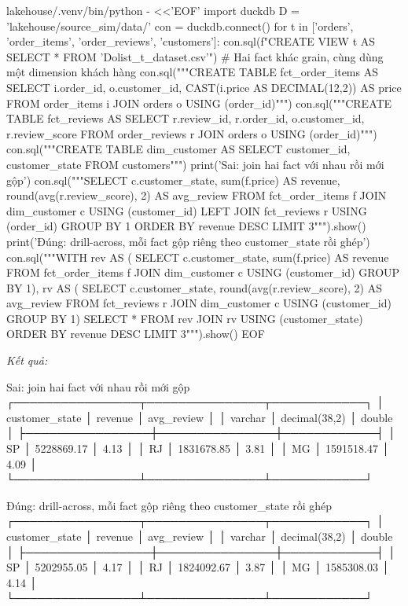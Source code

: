 \begin{codeblock}
lakehouse/.venv/bin/python - <<'EOF'
import duckdb
D = 'lakehouse/source_sim/data/'
con = duckdb.connect()
for t in ['orders', 'order_items', 'order_reviews', 'customers']:
    con.sql(f"CREATE VIEW {t} AS SELECT * FROM '{D}olist_{t}_dataset.csv'")
# Hai fact khác grain, cùng dùng một dimension khách hàng
con.sql("""CREATE TABLE fct_order_items AS
  SELECT i.order_id, o.customer_id, CAST(i.price AS DECIMAL(12,2)) AS price
  FROM order_items i JOIN orders o USING (order_id)""")
con.sql("""CREATE TABLE fct_reviews AS
  SELECT r.review_id, r.order_id, o.customer_id, r.review_score
  FROM order_reviews r JOIN orders o USING (order_id)""")
con.sql("""CREATE TABLE dim_customer AS
  SELECT customer_id, customer_state FROM customers""")
print('Sai: join hai fact với nhau rồi mới gộp')
con.sql("""SELECT c.customer_state, sum(f.price) AS revenue,
                  round(avg(r.review_score), 2) AS avg_review
           FROM fct_order_items f JOIN dim_customer c USING (customer_id)
           LEFT JOIN fct_reviews r USING (order_id)
           GROUP BY 1 ORDER BY revenue DESC LIMIT 3""").show()
print('Đúng: drill-across, mỗi fact gộp riêng theo customer_state rồi ghép')
con.sql("""WITH rev AS (
             SELECT c.customer_state, sum(f.price) AS revenue
             FROM fct_order_items f JOIN dim_customer c USING (customer_id)
             GROUP BY 1),
           rv AS (
             SELECT c.customer_state, round(avg(r.review_score), 2) AS avg_review
             FROM fct_reviews r JOIN dim_customer c USING (customer_id)
             GROUP BY 1)
           SELECT * FROM rev JOIN rv USING (customer_state)
           ORDER BY revenue DESC LIMIT 3""").show()
EOF
\end{codeblock}
\textit{Kết quả:}
\begin{codeblock}
Sai: join hai fact với nhau rồi mới gộp
┌────────────────┬───────────────┬────────────┐
│ customer_state │    revenue    │ avg_review │
│    varchar     │ decimal(38,2) │   double   │
├────────────────┼───────────────┼────────────┤
│ SP             │    5228869.17 │       4.13 │
│ RJ             │    1831678.85 │       3.81 │
│ MG             │    1591518.47 │       4.09 │
└────────────────┴───────────────┴────────────┘

Đúng: drill-across, mỗi fact gộp riêng theo customer_state rồi ghép
┌────────────────┬───────────────┬────────────┐
│ customer_state │    revenue    │ avg_review │
│    varchar     │ decimal(38,2) │   double   │
├────────────────┼───────────────┼────────────┤
│ SP             │    5202955.05 │       4.17 │
│ RJ             │    1824092.67 │       3.87 │
│ MG             │    1585308.03 │       4.14 │
└────────────────┴───────────────┴────────────┘
\end{codeblock}

